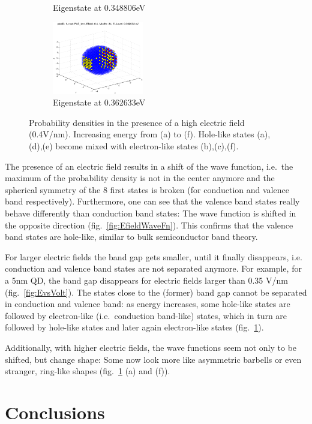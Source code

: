 \begin{figure}[htbp]
\begin{subfigure}{150px}
		\caption{Eigenstate at 0.348806eV}
	\end{subfigure}
	\begin{subfigure}{150px}
		\includegraphics[width=150px]{Fig/Plots/r25v04Mod34}
		\caption{Eigenstate at 0.362633eV}
	\end{subfigure}
	\caption{Probability densities in the presence of a high electric field (0.4V/nm). Increasing energy from (a) to (f). Hole-like states (a),(d),(e) become mixed with electron-like states (b),(c),(f).}
	\label{fig:HighEfieldWaveFn}
\end{figure}


The presence of an electric field results in a shift of the wave function, i.e.~the maximum of the probability density is not in the center anymore and the spherical symmetry of the 8 first states is broken (for conduction and valence band respectively). Furthermore, one can see that the valence band states really behave differently than conduction band states: The wave function is shifted in the opposite direction (fig.~\ref{fig:EfieldWaveFn}). This confirms that the valence band states are hole-like, similar to bulk semiconductor band theory. 
	
For larger electric fields the band gap gets smaller, until it finally disappears, i.e. conduction and valence band states are not separated anymore. For example, for a 5nm  QD, the band gap disappears for electric fields larger than 0.35 V/nm (fig.~\ref{fig:EvsVolt}). The states close to the (former) band gap cannot be separated in conduction and valence band: as energy increases, some hole-like states are followed by electron-like (i.e.~conduction band-like) states, which in turn are followed by hole-like states and later again electron-like states (fig.~\ref{fig:HighEfieldWaveFn}).
	
Additionally, with higher electric fields, the wave functions seem not only to be shifted, but change shape: Some now look more like asymmetric barbells or even stranger, ring-like shapes (fig.~\ref{fig:HighEfieldWaveFn} (a) and (f)).

\FloatBarrier

\section{Conclusions}

